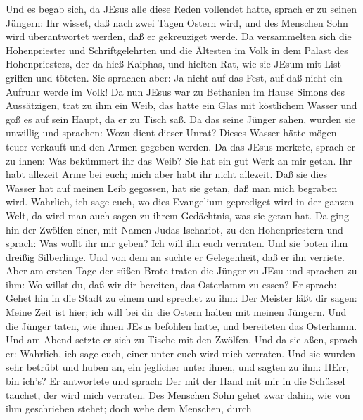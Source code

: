  Und es begab sich, da JEsus alle diese Reden vollendet
hatte, sprach er zu seinen Jüngern:  Ihr wisset, daß nach
zwei Tagen Ostern wird, und des Menschen Sohn wird überantwortet werden,
daß er gekreuziget werde.  Da versammelten sich die
Hohenpriester und Schriftgelehrten und die Ältesten im Volk in dem
Palast des Hohenpriesters, der da hieß Kaiphas,  und hielten
Rat, wie sie JEsum mit List griffen und töteten.  Sie
sprachen aber: Ja nicht auf das Fest, auf daß nicht ein Aufruhr werde im
Volk!  Da nun JEsus war zu Bethanien im Hause Simons des
Aussätzigen,  trat zu ihm ein Weib, das hatte ein Glas mit
köstlichem Wasser und goß es auf sein Haupt, da er zu Tisch saß.
 Da das seine Jünger sahen, wurden sie unwillig und
sprachen: Wozu dient dieser Unrat?  Dieses Wasser hätte
mögen teuer verkauft und den Armen gegeben werden.  Da das
JEsus merkete, sprach er zu ihnen: Was bekümmert ihr das Weib? Sie hat
ein gut Werk an mir getan.  Ihr habt allezeit Arme bei
euch; mich aber habt ihr nicht allezeit.  Daß sie dies
Wasser hat auf meinen Leib gegossen, hat sie getan, daß man mich
begraben wird.  Wahrlich, ich sage euch, wo dies Evangelium
geprediget wird in der ganzen Welt, da wird man auch sagen zu ihrem
Gedächtnis, was sie getan hat.  Da ging hin der Zwölfen
einer, mit Namen Judas Ischariot, zu den Hohenpriestern 
und sprach: Was wollt ihr mir geben? Ich will ihn euch verraten. Und sie
boten ihm dreißig Silberlinge.  Und von dem an suchte er
Gelegenheit, daß er ihn verriete.  Aber am ersten Tage der
süßen Brote traten die Jünger zu JEsu und sprachen zu ihm: Wo willst du,
daß wir dir bereiten, das Osterlamm zu essen?  Er sprach:
Gehet hin in die Stadt zu einem und sprechet zu ihm: Der Meister läßt
dir sagen: Meine Zeit ist hier; ich will bei dir die Ostern halten mit
meinen Jüngern.  Und die Jünger taten, wie ihnen JEsus
befohlen hatte, und bereiteten das Osterlamm.  Und am Abend
setzte er sich zu Tische mit den Zwölfen.  Und da sie aßen,
sprach er: Wahrlich, ich sage euch, einer unter euch wird mich verraten.
 Und sie wurden sehr betrübt und huben an, ein jeglicher
unter ihnen, und sagten zu ihm: HErr, bin ich's?  Er
antwortete und sprach: Der mit der Hand mit mir in die Schüssel tauchet,
der wird mich verraten.  Des Menschen Sohn gehet zwar
dahin, wie von ihm geschrieben stehet; doch wehe dem Menschen, durch
